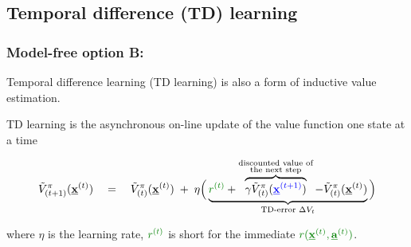 \subsection{Temporal difference (TD) learning}

\begin{frame}\frametitle{Model-free option B:~\subsecname}

Temporal difference learning (TD learning) is also a form of inductive value estimation.


\pause 

\vspace{2mm}

TD learning is the asynchronous on-line update of the value function one state at a time
	\slidesonly{\vspace{-8mm}}
	
	\begin{equation}
		\tilde V^{\pi}_{(t+1)}(\vec x^{(t)}) \quad = \quad 
		\tilde V^{\pi}_{(t)}(\vec x^{(t)}) \;+\;
		\lr \Big( \underbrace{{\color{reward}r^{(t)}} 
		+ \overbrace{
		\gamma \tilde V^{\pi}_{(t)}({\color{trans}\vec x^{(t+1)}})
		}^{\substack{\text{discounted value of}\\ \text{the next step}}} 
		- \tilde V^{\pi}_{(t)}{(\vec x^{(t)})}}_{\text{TD-error }\Delta V_t} \Big) 
	\end{equation}
	
	where $\eta$ is the learning rate, ${\color{reward}r^{(t)}}$ is short for the immediate ${\color{reward}r(\vec x^{(t)},\vec a^{(t)})}$.
	
\end{frame}
